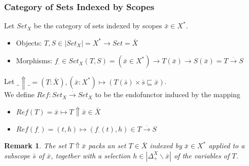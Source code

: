 \documentclass[aspectratio=169]{beamer}
\theoremstyle{remarkstyle}
\newtheorem*{remark}{Remark}
\begin{document}
\begin{frame}[fragile]
  \frametitle{Category of Sets Indexed by Scopes}
  \begin{definition}
    Let $Set_X$ be the category of sets indexed by scopes $\bar{x} ∈ X^*$.
    \begin{itemize}
      \item Objects: $T, S ∈ |Set_X| = X^* → Set = \bar{X}$
      \item Morphisms: $f_⋅ ∈ Set_X(T, S) = (\bar{x}∈X^*) → T(\bar{x}) → S(\bar{x}) = T \stackrel{⋅}{→} S$
    \end{itemize}
  \end{definition}
  \begin{definition}
    Let $\_⇑\_ = (T : \bar{X}), (\bar{x} : X^*) ↦ (T(\bar{s}) × \bar{s} ⊑ \bar{x})$.\\
    We define $Ref : Set_X \stackrel{⋅}{→} Set_X$ to be the endofunctor induced by the mapping
    \begin{itemize}
      \item $Ref(T) = \bar{x} ↦ T ⇑ \bar{x} ∈ \bar{X}$
      \item{$Ref(f_⋅) = (t, h) ↦ (f_⋅(t) , h) ∈ T \stackrel{⋅}{→} S$}
    \end{itemize}
  \end{definition}
  \begin{remark}
    The set $T⇑\bar{x}$ packs an set $T ∈ \bar{X}$ indexed by $\bar{x} ∈ X^*$ applied to a subscope $\bar{s}$ of $\bar{x}$, together with a selection $h ∈ |Δ_+^X∖\bar{x}|$ of the variables of $T$.
  \end{remark}
\end{frame}


\end{document}
